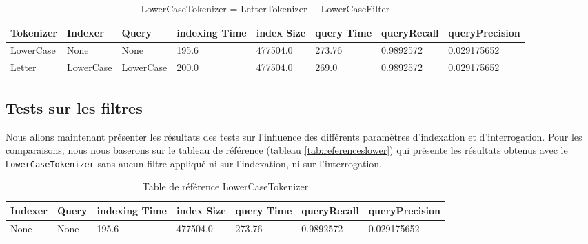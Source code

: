 \begin{table}[!htbp]
    \hspace{-2.5cm}
                \begin{tabular}{|p{2cm}|p{2cm}|p{2cm}|p{2cm}|p{2cm}|p{2cm}|p{2cm}|p{2.5cm}|}
                    \hline
                    \textbf{Tokenizer} & \textbf{Indexer} & \textbf{Query} & \textbf{indexing Time} & \textbf{index Size} & \textbf{query Time} & \textbf{queryRecall} & \textbf{queryPrecision}\\
                    \hline
LowerCase & None & None & 195.6 & 477504.0 & 273.76 & 0.9892572 & 0.029175652\\
		\hline
Letter & LowerCase & LowerCase & 200.0 & 477504.0 & 269.0 & 0.9892572 & 0.029175652\\
                    \hline
                \end{tabular}
                \caption{LowerCaseTokenizer = LetterTokenizer + LowerCaseFilter}
                \label{tab:tests_tokenizers_2}
            \end{table}

\subsection{Tests sur les filtres}

Nous allons maintenant présenter les résultats des tests sur l’influence des différents paramètres d’indexation et d’interrogation. Pour les comparaisons, nous nous baserons sur le tableau de référence (tableau \ref{tab:referenceslower}) qui présente les résultats obtenus avec le \texttt{LowerCaseTokenizer} sans aucun filtre appliqué ni sur l’indexation, ni sur l’interrogation.

\begin{table}[!htbp]
    \hspace{-2cm}
                \begin{tabular}{|p{2cm}|p{2cm}|p{2cm}|p{2cm}|p{2.5cm}|p{2.5cm}|p{2.5cm}|}
                    \hline
                    \textbf{Indexer} & \textbf{Query} & \textbf{indexing Time} & \textbf{index Size} & \textbf{query Time} & \textbf{queryRecall} & \textbf{queryPrecision}\\
                    \hline
None & None & 195.6 & 477504.0 & 273.76 & 0.9892572 & 0.029175652\\
                    \hline
                \end{tabular}
                \caption{Table de référence LowerCaseTokenizer}
                \label{tab:references}
            \end{table}

